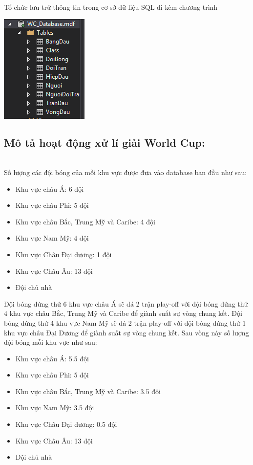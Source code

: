 \documentclass[a4paper]{article}
\begin{document}
\hspace{0.5cm}Tổ chức lưu trứ thông tin trong cơ sở dữ liệu SQL đi kèm chương trình
\begin{center}
\includegraphics[scale=1.3]{hinh4.png}    
\end{center}
\subsection{Mô tả hoạt động xử lí giải World Cup:}\\

\hspace{0.5cm}Số lượng các đội bóng của mỗi khu vực được đưa vào database ban đầu như sau:
\begin{itemize}
\item Khu vực châu Á: 6 đội
\item Khu vực châu Phi: 5 đội
\item Khu vực châu Bắc, Trung Mỹ và Caribe: 4 đội
\item Khu vực Nam Mỹ: 4 đội
\item Khu vực Châu Đại dương: 1 đội
\item Khu vực Châu Âu: 13 đội
\item Đội chủ nhà
\end{itemize}

Đội bóng đứng thứ 6 khu vực châu Á sẽ đá 2 trận play-off với đội bóng đứng thứ 4 khu vực châu Bắc, Trung Mỹ và Caribe để giành suất sự vòng chung kết. Đội bóng đứng thứ 4 khu vực Nam Mỹ sẽ đá 2 trận play-off với đội bóng đứng thứ 1 khu vực châu Đại Dương để giành suất sự vòng chung kết. Sau vòng này số lượng đội bóng mỗi khu vực như sau:
\begin{itemize}
\item Khu vực châu Á: 5.5 đội
\item Khu vực châu Phi: 5 đội
\item Khu vực châu Bắc, Trung Mỹ và Caribe: 3.5 đội
\item Khu vực Nam Mỹ: 3.5 đội
\item Khu vực Châu Đại dương: 0.5 đội
\item Khu vực Châu Âu: 13 đội
\item Đội chủ nhà
\end{itemize}
\end{document}
